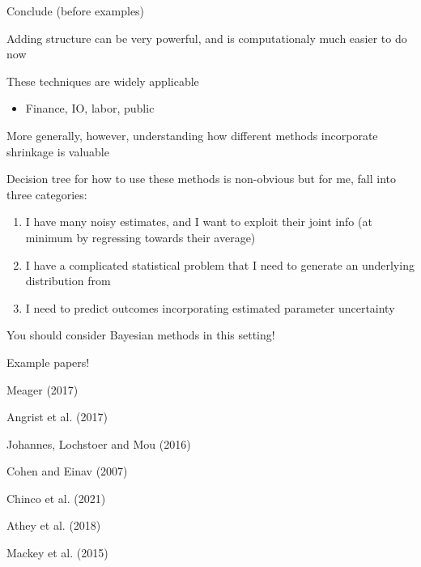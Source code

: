 \documentclass[notes,11pt, aspectratio=169]{beamer}
\newenvironment{wideitemize}{\itemize\addtolength{\itemsep}{10pt}}{\enditemize}
\begin{document}
\begin{frame}{Conclude (before examples)}
  \begin{wideitemize}
  \item Adding structure can be very powerful, and is computationaly much easier to do now
  \item These techniques are widely applicable
    \begin{itemize}
    \item Finance, IO, labor, public
    \end{itemize}
  \item More generally, however, understanding how different methods
    incorporate shrinkage is valuable
  \item Decision tree for how to use these methods is non-obvious but for me, fall into three categories:
    \begin{enumerate}
    \item I have many noisy estimates, and I want to exploit their
      joint info (at minimum by regressing towards their average)
    \item I have a complicated statistical problem that I need to
      generate an underlying distribution from
    \item I need to predict outcomes incorporating estimated parameter
      uncertainty
    \end{enumerate}
\item You should consider Bayesian methods in this setting!
  \end{wideitemize}
 
\end{frame}

\begin{frame}{Example papers!}
  \begin{wideitemize}
  \item Meager (2017)
  \item Angrist et al. (2017)
  \item Johannes, Lochstoer and Mou (2016)
  \item Cohen and Einav (2007)
  \item Chinco et al. (2021)
  \item Athey et al. (2018)
    \item Mackey et al. (2015)
  \end{wideitemize}
  
\end{frame}
\end{document}
